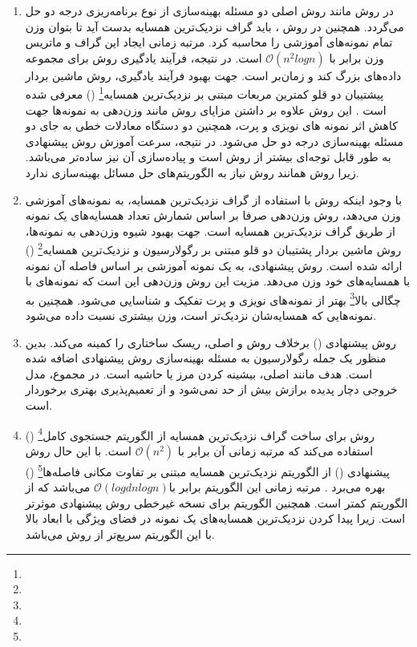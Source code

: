 \begin{enumerate}
	\item 	در روش  مانند روش  اصلی دو مسئله بهینه‌سازی از نوع برنامه‌ریزی درجه دو حل می‌گردد. همچنین در روش ، باید گراف نزدیک‌ترین همسایه بدست آید تا بتوان وزن تمام نمونه‌های آموزشی را محاسبه کرد. مرتبه زمانی ایجاد این گراف و ماتریس وزن برابر با $\mathcal{O}(n^{2}logn)$ است. در نتیجه، فرآیند یادگیری روش  برای مجموعه داده‌های بزرگ کند و زمان‌بر است. جهت بهبود فرآیند یادگیری، روش ماشین بردار پیشتیبان دو قلو کمترین مربعات مبتنی بر نزدیک‌ترین همسایه\footnote{}  () معرفی شده است \cite{mir2018}. این روش علاوه بر داشتن مزایای روش  مانند وزن‌دهی به نمونه‌ها جهت کاهش اثر نمونه های نویزی و پرت، همچنین دو دستگاه معادلات خطی به جای دو مسئله بهینه‌سازی درجه دو حل می‌شود. در نتیجه، سرعت آموزش روش پیشنهادی به طور قابل توجه‌ای بیشتر از روش  است و پیاده‌سازی آن نیز ساده‌تر می‌باشد. زیرا روش  همانند روش   نیاز به الگوریتم‌های حل مسائل بهینه‌سازی ندارد.
	\item با وجود اینکه روش  با استفاده از گراف نزدیک‌ترین همسایه، به نمونه‌های آموزشی وزن می‌دهد، روش وزن‌دهی صرفا بر اساس شمارش تعداد همسایه‌های یک نمونه از طریق گراف نزدیک‌ترین همسایه است.  جهت بهبود شیوه وزن‌دهی به نمونه‌ها، روش ماشین بردار پشتیبان دو قلو مبتنی بر رگولارسیون و نزدیک‌ترین همسایه\footnote{}  () ارائه شده است. روش پیشنهادی، به یک نمونه آموزشی بر اساس فاصله آن نمونه با همسایه‌های خود وزن می‌دهد. مزیت این روش وزن‌دهی این است که نمونه‌های با چگالی بالا\footnote{} بهتر از نمونه‌های نویزی و پرت تفکیک و شناسایی می‌شود. همچنین به نمونه‌هایی که همسایه‌شان نزدیک‌تر است، وزن بیشتری نسبت داده می‌شود.
	\item روش پیشنهادی () برخلاف روش  و  اصلی، ریسک ساختاری را کمینه می‌کند. بدین منظور یک جمله رگولارسیون به مسئله بهینه‌سازی روش پیشنهادی اضافه شده است. هدف مانند  اصلی، بیشینه کردن مرز یا حاشیه است. در مجموع، مدل خروجی دچار پدیده برازش بیش از حد نمی‌شود و از تعمیم‌پذیری بهتری برخوردار است.
	\item	روش  برای ساخت گراف نزدیک‌ترین همسایه از الگوریتم جستجوی کامل\footnote{}  () استفاده می‌کند که مرتبه زمانی آن برابر با $\mathcal{O}(n^{2})$ است. با این حال روش پیشنهادی () از الگوریتم نزدیک‌ترین همسایه مبتنی بر تفاوت مکانی فاصله‌ها\footnote{}  () بهره می‌برد \cite{xia2015}. مرتبه زمانی این الگوریتم برابر با$\mathcal{O}(log d n log n)$  می‌باشد که از الگوریتم  کمتر است. همچنین الگوریتم  برای نسخه غیرخطی روش پیشنهادی موثرتر است. زیرا پیدا کردن نزدیک‌ترین همسایه‌های یک نمونه در فضای ویژگی با ابعاد بالا با این الگوریتم سریع‌تر از روش  می‌باشد.
\end{enumerate}

\newpage
